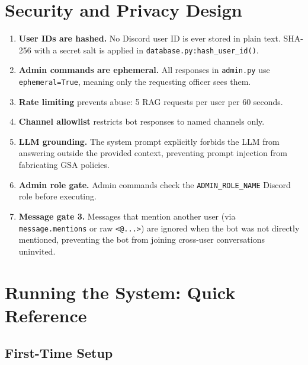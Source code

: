\documentclass[12pt,letterpaper]{article}
\begin{document}
\section{Security and Privacy Design}

\begin{enumerate}[leftmargin=2em]
  \item \textbf{User IDs are hashed.} No Discord user ID is ever stored in
        plain text. SHA-256 with a secret salt is applied in
        \texttt{database.py:hash\_user\_id()}.
  \item \textbf{Admin commands are ephemeral.} All responses in \texttt{admin.py}
        use \texttt{ephemeral=True}, meaning only the requesting officer sees them.
  \item \textbf{Rate limiting} prevents abuse: 5 RAG requests per user per 60 seconds.
  \item \textbf{Channel allowlist} restricts bot responses to named channels only.
  \item \textbf{LLM grounding.} The system prompt explicitly forbids the LLM from
        answering outside the provided context, preventing prompt injection from
        fabricating GSA policies.
  \item \textbf{Admin role gate.} Admin commands check the \texttt{ADMIN\_ROLE\_NAME}
        Discord role before executing.
  \item \textbf{Message gate 3.} Messages that mention another user (via
        \texttt{message.mentions} or raw \texttt{<@...>}) are ignored when the
        bot was not directly mentioned, preventing the bot from joining
        cross-user conversations uninvited.
\end{enumerate}

\section{Running the System: Quick Reference}

\subsection{First-Time Setup}
\end{document}
